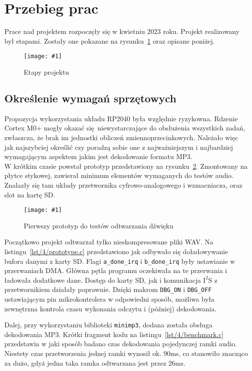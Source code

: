 \documentclass[polish]{aghengthesis}
\newcommand{\imgint}[4]{
	\begin{figure}[{#4}]
		\centering
		\texttt{[image: \#1]}
		\caption{#2}
		\label{#1}
	\end{figure}
}
\newcommand{\imgh}[3]{\imgint{#1}{#2}{#3}{H}}
\newcommand{\isqs}{$\text{I}^{2}\text{S}$}
\newcommand{\lstfile}[3]{
	\noindent
	\hspace{0.1\linewidth}
	\begin{minipage}{0.8\linewidth}
		
	\end{minipage}
	\vspace{0.3cm}
}
\begin{document}
	\section{Przebieg prac}
		Prace nad projektem rozpoczęły się w kwietniu 2023 roku. Projekt realizowany był etapami. Zostały one pokazane na rysunku~\ref{4/PicoRadio-steps} oraz opisane poniżej.
		
		\imgh{4/PicoRadio-steps}{Etapy projektu}{1}
		
		\subsection{Określenie wymagań sprzętowych}
			Propozycja wykorzystania układu RP2040 była względnie ryzykowna. Rdzenie Cortex M0+ mogły okazać się niewystarczające do obsłużenia wszystkich zadań, zwłaszcza, że brak im jednostki obliczeń zmiennoprzecinkowych. Należało więc jak najszybciej określić czy poradzą sobie one z najważniejszym i najbardziej wymagającym aspektem jakim jest dekodowanie formatu MP3.
			$ $\\
			
			W krótkim czasie powstał prototyp przedstawiony na rysunku~\ref{4/prototype_1}. Zmontowany na płytce stykowej, zawierał minimum elementów wymaganych do testów audio. Znalazły się tam układy przetwornika cyfrowo-analogowego i wzmacniacza, oraz slot na kartę SD.
			
			\imgh{4/prototype_1}{Pierwszy prototyp do testów odtwarzania dźwięku}{0.6}
			
			\lstfile{c}{Realizacja podstawowego ładowania bufora}{lst/4/prototype.c}
			
			Początkowo projekt odtwarzał tylko nieskompresowane pliki WAV. Na listingu~\ref{lst/4/prototype.c} przedstawiono jak odbywało się doładowywanie bufora danymi z karty SD. Flagi \lstinline|a_done_irq| i \lstinline|b_done_irq| były ustawianie w przerwaniach DMA. Główna pętla programu oczekiwała na te przerwania i ładowała dodatkowe dane. Dostęp do karty SD, jak i komunikacja \isqs{} z przetwornikiem działały poprawnie. Dzięki makrom \lstinline|DBG_ON| i \lstinline|DBG_OFF| ustawiającym pin mikrokontrolera w odpowiedni sposób, możliwa była zewnętrzna kontrola czasu wykonania odczytu i (później) dekodowania.
			
			Dalej, przy wykorzystaniu biblioteki \lstinline|minimp3|\textsuperscript{\cite{minimp3}}, dodana została obsługa dekodowania MP3. Krótki fragment kodu na listingu~\ref{lst/4/benchmark.c} przedstawia w jaki sposób badano czas dekodowania pojedynczej ramki audio. Niestety czas przetworzenia jednej ramki wynosił ok. 90ms, co stanowiło znacząco za dużo, gdyż jedna taka ramka odtwarzana jest przez 26ms.
\end{document}
